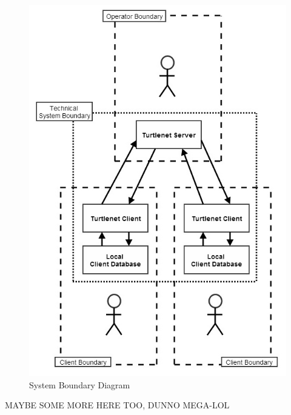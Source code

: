 \begin{figure}[h]
    \centering
    \includegraphics[width=\textwidth]{images/requirements/systemboundarydiagram.jpg}
    \caption{System Boundary Diagram}
    \label{fig:sbd_diag}
\end{figure}

MAYBE SOME MORE HERE TOO, DUNNO MEGA-LOL
